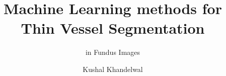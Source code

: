\title{Machine Learning methods for Thin Vessel Segmentation}

\subtitle{in Fundus Images}

\author{Kushal Khandelwal}



\renewcommand{\submissiontext}{This thesis is submitted in requirements of the course BITS C421T}




\subject{LaTeX} 
